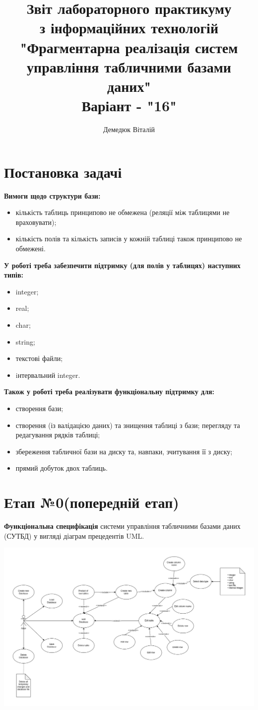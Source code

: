 \documentclass[a4paper, 12pt]{article}
\author{Демедюк Віталій}
\title{Звіт лабораторного практикуму\\
       з інформаційних технологій\\
       "Фрагментарна реалізація систем управління табличними базами даних"\\
       Варіант - "16"}
\begin{document}
\maketitle

\newpage

\tableofcontents

\newpage

\section{Постановка задачі}

\textbf{Вимоги щодо структури бази:}

\begin{itemize}
\item кількість таблиць принципово не обмежена (реляції між таблицями не враховувати);
\item кількість полів та кількість записів у кожній таблиці також принципово не обмежені.
\end{itemize}


\textbf{У роботі треба забезпечити підтримку (для полів у таблицях) наступних типів:}

\begin{itemize}
\item integer;
\item real;
\item char;
\item string;
\item текстові файли;
\item iнтервальний integer.
\end{itemize}

\textbf{Також у роботі треба реалізувати функціональну підтримку для:}

\begin{itemize}
\item створення бази;
\item створення (із валідацією даних) та знищення таблиці з бази;
перегляду та редагування рядків таблиці;
\item збереження табличної бази на диску та, навпаки, зчитування її з диску;
\item прямий добуток двох таблиць.
\end{itemize}

\section{Етап №0(попередній етап)}

\textbf{Функціональна специфікація} системи управління табличними базами даних (СУТБД) у вигляді діаграм прецедентів UML.

\includegraphics[scale=0.4]{../diagrams/use_case.png}
\end{document}
